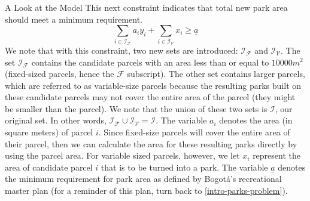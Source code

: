 \documentclass[12pt]{pom_thesis}
\theoremstyle{definition}
\begin{document}
\begin{chapter}{A Look at the Model}
This next constraint indicates that total new park area should meet a minimum requirement.
\begin{equation} \label{constraint-9}
\sum_{i \in \mathcal{I_F}} a_iy_i + \sum_{i \in \mathcal{I_V}} x_i  \geq \underline{a}
\end{equation}
We note that with this constraint, two new sets are introduced: $\mathcal{I_F}$ and $\mathcal{I_V}$. The set $\mathcal{I_F}$ contains the candidate parcels with an area less than or equal to $10000m^2$ (fixed-sized parcels, hence the $\mathcal{F}$ subscript). The other set contains larger parcels, which are referred to as variable-size parcels because the resulting parks built on these candidate parcels may not cover the entire area of the parcel (they might be smaller than the parcel). We note that the union of these two sets is $\mathcal{I}$, our original set. In other words, $\mathcal{I_F} \cup \mathcal{I_V} = \mathcal{I}.$
The variable $a_i$ denotes the area (in square meters) of parcel $i$. Since fixed-size parcels will cover the entire area of their parcel, then we can calculate the area for these resulting parks directly by using the parcel area. For variable sized parcels, however, we let $x_i$ represent the area of candidate parcel $i$ that is to be turned into a park. The variable $\underline{a}$ denotes the minimum requirement for park area as defined by Bogot\'{a}'s recreational master plan (for a reminder of this plan, turn back to \autoref{intro-parks-problem}). \\


\end{chapter}
\end{document}
